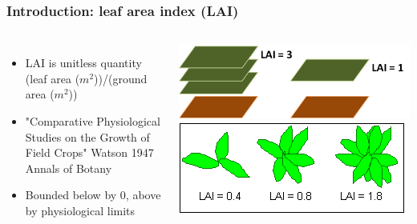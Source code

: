 \documentclass{beamer}
\begin{document}
\begin{frame}
    \frametitle{Introduction: leaf area index (LAI)}
    \begin{columns}

        \column{2in}
            \begin{itemize}
                \item LAI is unitless quantity (leaf area ($m^2$))/(ground area ($m^2$))
                \item "Comparative Physiological Studies on the Growth of Field Crops" Watson 1947 Annals of Botany
                \item Bounded below by 0, above by physiological limits
            \end{itemize}

        \column{3in}
            \includegraphics[width=\columnwidth,height=\textheight,keepaspectratio]{../img/lai.png}\\
            \includegraphics[width=\columnwidth,height=\textheight,keepaspectratio]{../img/lai2.png}

    \end{columns}
\end{frame}
\end{document}
